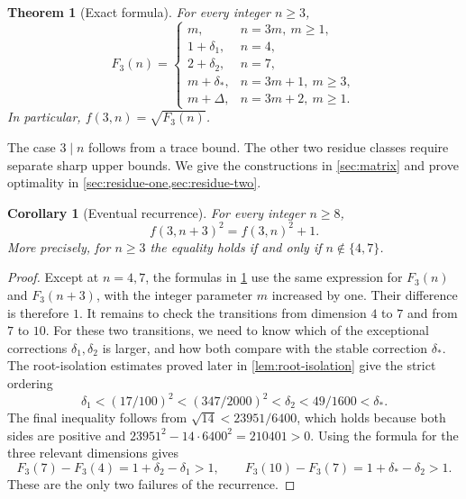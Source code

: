 \documentclass[11pt]{article}
\numberwithin{equation}{section}
\newtheorem{theorem}{Theorem}[section]
\newtheorem{corollary}[corollary]{Corollary}
\theoremstyle{definition}
\theoremstyle{definition}
\newcommand{\F}{F_3}
\newcommand{\ds}{\delta_*}
\newcommand{\Dlt}{\Delta}
\begin{document}
\begin{theorem}[Exact formula]\label{thm:sharp-values}
For every integer $n\ge3$,
\begin{equation}\label{eq:main-formula}
 \F(n)=
 \begin{cases}
 m,& n=3m,\ m\ge1,\\
 1+\delta_1,&n=4,\\
 2+\delta_2,&n=7,\\
 m+\ds,&n=3m+1,\ m\ge3,\\
 m+\Dlt,&n=3m+2,\ m\ge1.
 \end{cases}
\end{equation}
In particular, $f(3,n)=\sqrt{\F(n)}$.
\end{theorem}

The case $3\mid n$ follows from a trace bound. The other two
residue classes require separate sharp upper bounds.  We give the constructions
in \cref{sec:matrix} and prove optimality in
\cref{sec:residue-one,sec:residue-two}.

\begin{corollary}[Eventual recurrence]\label{cor:eventual-recurrence}
For every integer $n\ge8$,
\begin{equation}\label{eq:recurrence}
 f(3,n+3)^2=f(3,n)^2+1.
\end{equation}
More precisely, for $n\ge3$ the equality holds if and only if
$n\notin\{4,7\}$.
\end{corollary}
\begin{proof}
Except at $n=4,7$, the formulas in \cref{thm:sharp-values}
use the same expression for $\F(n)$ and $\F(n+3)$, with the integer
parameter $m$ increased by one. Their difference is therefore $1$.
It remains to check the transitions from dimension $4$ to $7$
and from $7$ to $10$. For these two transitions, we need to know
which of the exceptional corrections $\delta_1,\delta_2$ is larger,
and how both compare with the stable correction $\ds$.
The root-isolation estimates proved later in \cref{lem:root-isolation}
give the strict ordering
\[
 \delta_1<(17/100)^2<(347/2000)^2<\delta_2
 <49/1600<\ds.
\]
The final inequality follows from
$\sqrt{14}<23951/6400$, which holds because both sides are positive
and $23951^2-14\cdot6400^2=210401>0$.
Using the formula for the three relevant dimensions gives
\[
 \F(7)-\F(4)=1+\delta_2-\delta_1>1,\qquad
 \F(10)-\F(7)=1+\ds-\delta_2>1.
\]
These are the only two failures of the recurrence.
\end{proof}
\end{document}
